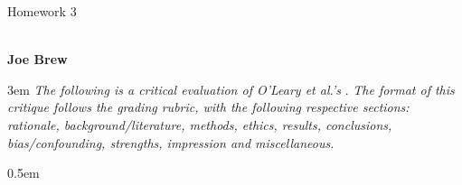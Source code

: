 \documentclass{article}
\begin{document}

\fancyhfoffset[O,O]{0pt}

\begin{center}
\begin{huge}
Homework 3 \end{huge} \\
\textbf{Joe Brew}
\end{center}

\vspace{3mm}

\begingroup
\leftskip3em
\rightskip\leftskip
\noindent \emph{The following is a critical evaluation of O'Leary et al.'s} . \emph{The format of this critique follows the grading rubric, with the following respective sections: rationale, background/literature, methods, ethics, results, conclusions, bias/confounding, strengths, impression and miscellaneous.}
\par
\endgroup
\vspace{10mm}
\openup 0.5em
\end{document}
